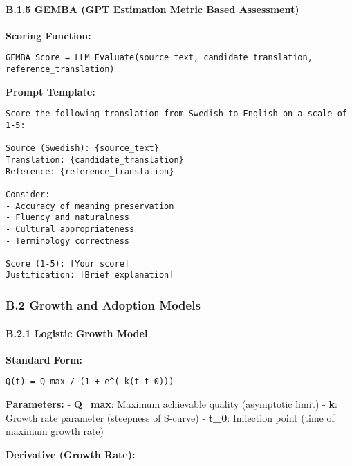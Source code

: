 \documentclass[12pt,a4paper]{article}
\begin{document}
{{{{{\hypertarget{b.1.5-gemba-gpt-estimation-metric-based-assessment}{%
\paragraph{B.1.5 GEMBA (GPT Estimation Metric Based
Assessment)}\label{b.1.5-gemba-gpt-estimation-metric-based-assessment}}

\textbf{Scoring Function:}

\begin{verbatim}
GEMBA_Score = LLM_Evaluate(source_text, candidate_translation, reference_translation)
\end{verbatim}

\textbf{Prompt Template:}

\begin{verbatim}
Score the following translation from Swedish to English on a scale of 1-5:

Source (Swedish): {source_text}
Translation: {candidate_translation}
Reference: {reference_translation}

Consider:
- Accuracy of meaning preservation
- Fluency and naturalness
- Cultural appropriateness
- Terminology correctness

Score (1-5): [Your score]
Justification: [Brief explanation]
\end{verbatim}

\hypertarget{b.2-growth-and-adoption-models}{%
\subsubsection{B.2 Growth and Adoption
Models}\label{b.2-growth-and-adoption-models}}

\hypertarget{b.2.1-logistic-growth-model}{%
\paragraph{B.2.1 Logistic Growth
Model}\label{b.2.1-logistic-growth-model}}

\textbf{Standard Form:}

\begin{verbatim}
Q(t) = Q_max / (1 + e^(-k(t-t_0)))
\end{verbatim}

\textbf{Parameters:} - \textbf{Q\_max}: Maximum achievable quality
(asymptotic limit) - \textbf{k}: Growth rate parameter (steepness of
S-curve) - \textbf{t\_0}: Inflection point (time of maximum growth rate)

\textbf{Derivative (Growth Rate):}

}}}}}
\end{document}
